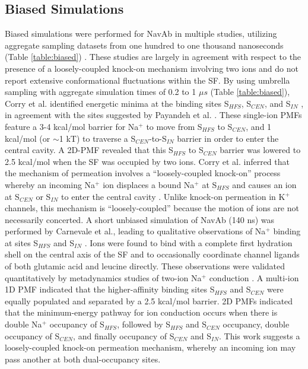 \begin{refsection}
 \subsection{Biased Simulations }
 Biased simulations were performed for NavAb in multiple studies, utilizing aggregate sampling datasets from one hundred to one thousand nanoseconds (Table \ref{table:biased}) \cite{Corry:2012ge,Corry:2013hg,Furini:2012jl,Furini:2014gv,Stock:2013cg,Domene:2015kj,FinolUrdaneta:2014bz,Mahdavi:2015gs,Ngo:2016es}.  These studies are largely in agreement with respect to the presence of a loosely-coupled knock-on mechanism involving two ions and do not report extensive conformational fluctuations within the SF.
By using umbrella sampling with aggregate simulation times of 0.2 to 1 $\mu s$ (Table \ref{table:biased}), Corry et al. identified energetic minima at the binding sites S$_{HFS}$, S$_{CEN}$, and S$_{IN}$ \cite{Corry:2012ge,Corry:2013hg}, in agreement with the sites suggested by Payandeh et al. \cite{Payandeh:2012ib}.  These single-ion PMFs feature a 3-4 kcal/mol barrier for Na$^{+}$ to move from S$_{HFS}$ to S$_{CEN}$, and 1 kcal/mol (or $\sim$1 kT) to traverse a S$_{CEN}$-to-S$_{IN}$ barrier in order to enter the central cavity.  A 2D-PMF revealed that this S$_{HFS}$ to S$_{CEN}$ barrier was lowered to 2.5 kcal/mol when the SF was occupied by two ions.  Corry et al. inferred that the mechanism of permeation involves a ``loosely-coupled knock-on'' process whereby an incoming Na$^{+}$ ion displaces a bound Na$^{+}$ at S$_{HFS}$ and causes an ion at S$_{CEN}$ or S$_{IN}$ to enter the central cavity \cite{Corry:2012ge}. Unlike knock-on permeation in K$^{+}$ channels, this mechanism is ``loosely-coupled'' because the motion of ions are not necessarily concerted. 
A short unbiased simulation of NavAb (140 ns) was performed by Carnevale et al., leading to qualitative observations of Na$^{+}$ binding at sites S$_{HFS}$ and S$_{IN}$ \cite{Carnevale:2011kp}.  Ions were found to bind with a complete first hydration shell on the central axis of the SF and to occasionally coordinate channel ligands of both glutamic acid and leucine directly.  These observations were validated quantitatively by metadynamics studies of two-ion Na$^{+}$ conduction \cite{Stock:2013cg}.  A multi-ion 1D PMF indicated that the higher-affinity binding sites S$_{HFS}$ and S$_{CEN}$ were equally populated and separated by a 2.5 kcal/mol barrier. 2D PMFs indicated that the minimum-energy pathway for ion conduction occurs when there is double Na$^{+}$ occupancy of S$_{HFS}$, followed by S$_{HFS}$ and S$_{CEN}$ occupancy, double occupancy of S$_{CEN}$, and finally occupancy of S$_{CEN}$ and S$_{IN}$.  This work suggests a loosely-coupled knock-on permeation mechanism, whereby an incoming ion may pass another at both dual-occupancy sites.

\end{refsection}
